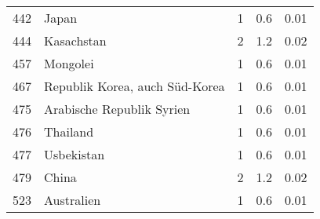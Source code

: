 \begin{longtable}{lXrrr}
        442 & \multicolumn{1}{X}{Japan} & %
          \num{1} &
          \num[round-mode=places,round-precision=2]{0,6} &
          \num[round-mode=places,round-precision=2]{0,01} \\

        444 & \multicolumn{1}{X}{Kasachstan} & %
          \num{2} &
          \num[round-mode=places,round-precision=2]{1,2} &
          \num[round-mode=places,round-precision=2]{0,02} \\

        457 & \multicolumn{1}{X}{Mongolei} & %
          \num{1} &
          \num[round-mode=places,round-precision=2]{0,6} &
          \num[round-mode=places,round-precision=2]{0,01} \\

        467 & \multicolumn{1}{X}{Republik Korea, auch Süd-Korea} & %
          \num{1} &
          \num[round-mode=places,round-precision=2]{0,6} &
          \num[round-mode=places,round-precision=2]{0,01} \\

        475 & \multicolumn{1}{X}{Arabische Republik Syrien} & %
          \num{1} &
          \num[round-mode=places,round-precision=2]{0,6} &
          \num[round-mode=places,round-precision=2]{0,01} \\

        476 & \multicolumn{1}{X}{Thailand} & %
          \num{1} &
          \num[round-mode=places,round-precision=2]{0,6} &
          \num[round-mode=places,round-precision=2]{0,01} \\

        477 & \multicolumn{1}{X}{Usbekistan} & %
          \num{1} &
          \num[round-mode=places,round-precision=2]{0,6} &
          \num[round-mode=places,round-precision=2]{0,01} \\

        479 & \multicolumn{1}{X}{China} & %
          \num{2} &
          \num[round-mode=places,round-precision=2]{1,2} &
          \num[round-mode=places,round-precision=2]{0,02} \\

        523 & \multicolumn{1}{X}{Australien} & %
          \num{1} &
          \num[round-mode=places,round-precision=2]{0,6} &
          \num[round-mode=places,round-precision=2]{0,01} \\


\end{longtable}
